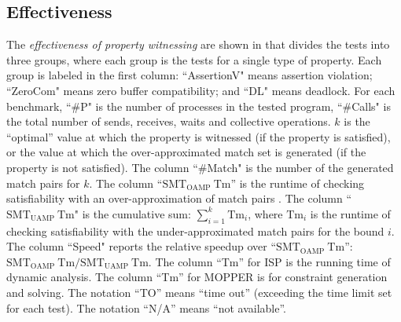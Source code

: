 \subsection{Effectiveness}


The \textit{effectiveness of property witnessing} are shown in  that divides the tests into three groups, where each group is the tests for a single type of property. Each group is labeled in the first column: ``AssertionV" means assertion violation; ``ZeroCom" means zero buffer compatibility; and ``DL" means deadlock. For each benchmark, ``\#P" is the number of processes in the tested program, ``\#Calls" is the total number of sends, receives, waits and collective operations.
$k$ is the ``optimal'' value at which the property is witnessed (if the property is satisfied), or the value at which the over-approximated match set is generated (if the property is not satisfied). 
The column ``\#Match" is the number of the generated match pairs for $k$. 
The column ``$\mathrm{SMT_{OAMP}\ Tm}$'' is the runtime of checking satisfiability with an over-approximation of match pairs \cite{DBLP:conf/kbse/HuangMM13}.
The column ``$\mathrm{SMT_{UAMP}\ Tm}$" is the cumulative sum: $\sum_{i=1}^k\mathrm{Tm}_i$, where $\mathrm{Tm}_i$ is the runtime of checking satisfiability with the under-approximated match pairs for the bound $i$.
The column ``Speed" reports the relative speedup over ``$\mathrm{SMT_{OAMP}\ Tm}$'': $\mathrm{SMT_{OAMP}\ Tm} / \mathrm{SMT_{UAMP}\ Tm}$.
The column ``Tm'' for ISP is the running time of dynamic analysis. 
The column ``Tm'' for MOPPER is for constraint generation and solving.
The notation ``TO'' means ``time out'' (exceeding the time limit set for each test). 
The notation ``N/A'' means ``not available''.


